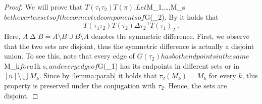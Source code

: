 \documentclass{amsart}
\makeatletter
\theoremstyle{plain}
{
	\newtheorem{{lemma}}{{Lemma}}[section]
	\labelformat{{lemma}}{{Lemma}##}
}
{
	\newtheorem{{theorem}}{{Theorem}}[section]
	\labelformat{{theorem}}{{Theorem}##}
}
{	\@namedef{c@{theorem}}{\@nameuse{c@{lemma}}}}
{
	\newtheorem{{corollary}}{{Corollary}}[section]
	\labelformat{{corollary}}{{Corollary}##}
}
{	\@namedef{c@{corollary}}{\@nameuse{c@{lemma}}}}
{
	\newtheorem{{proposition}}{{Proposition}}[section]
	\labelformat{{proposition}}{{Proposition}##}
}
{	\@namedef{c@{proposition}}{\@nameuse{c@{lemma}}}}
{
	\newtheorem{{algorithm}}{{Construction}}[section]
	\labelformat{{algorithm}}{{Construction}##}
}
{	\@namedef{c@{algorithm}}{\@nameuse{c@{lemma}}}}
\theoremstyle{definition}
{
	\newtheorem{{definition}}{{Definition}}[section]
	\labelformat{{definition}}{{Definition}##}
}
{	\@namedef{c@{definition}}{\@nameuse{c@{lemma}}}}
{
	\newtheorem{{problem}}{{Problem}}[section]
	\labelformat{{problem}}{{Problem}##}
}
{	\@namedef{c@{problem}}{\@nameuse{c@{lemma}}}}
\makeatother
\begin{document}
\begin{proof}
We will prove that ${T(\tau_1 \tau_2)} {T(\pi)}. Let $M_1,\ldots,M_s$ be the vertex sets of the connected components of ${G(\tau_2)}. By \cite[Ex 1.12]{bjoernerbrenti} it holds that 
\[ {T(\tau_1 \tau_2)} {T(\tau_2)}{\Delta} \tau_2^{-1} {T(\tau_1)}_2 \;.\]
Here, $A\operatorname{\Delta} B = A\setminus B \cup B\setminus A$ denotes the symmetric difference.
First, we observe that the two sets are disjoint, thus the symmetric difference is actually a disjoint union.
To see this, note that every edge of ${G(\tau_2)} has both endpoints in the same $M_k$ for a $1\leq k \leq s$, and every edge of ${G(\tau_1)} has its endpoints in different sets or in $[n]\setminus \bigcup M_k$. Since by \ref{lemma:parab} it holds that $\tau_2(M_k) = M_k$ for every $k$, this property is preserved under the conjugation with $\tau_2$. Hence, the sets are disjoint.


\end{proof}
\end{document}
